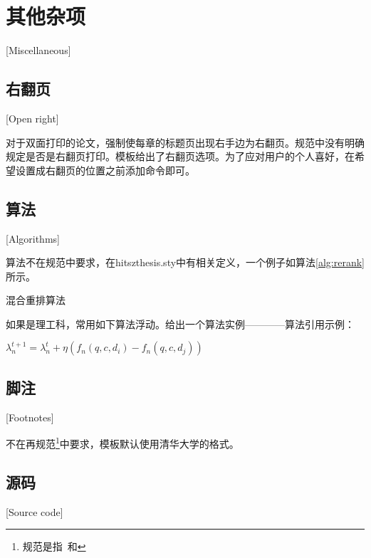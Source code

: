 \lipsum[1]

\section{其他杂项}[Miscellaneous]

\subsection{右翻页}[Open right]

对于双面打印的论文，强制使每章的标题页出现右手边为右翻页。规范中没有明确规定是否是右翻页打印。模板给出了右翻页选项。为了应对用户的个人喜好，在希望设置成右翻页的位置之前添加命令即可。

\subsection{算法}[Algorithms]

算法不在规范中要求，在hitszthesis.sty中有相关定义，一个例子如算法\ref{alg:rerank}所示。
\begin{algorithm}
	\DontPrintSemicolon
	\wuhao
	\caption{混合重排算法}
	\label{alg:rerank}
\end{algorithm}

如果是理工科，常用如下算法浮动。给出一个算法实例————算法引用示例：
\begin{algorithm}

	{
		$\lambda^{t+1}_n = \lambda^t_n + \eta (f_n(q, c, d_i) - f_n(q, c, d_j))$
	}
\end{algorithm}

\subsection{脚注}[Footnotes]

不在再规范\footnote{规范是指\PGR\ 和\UGR}中要求，模板默认使用清华大学的格式。

\subsection{源码}[Source code]

